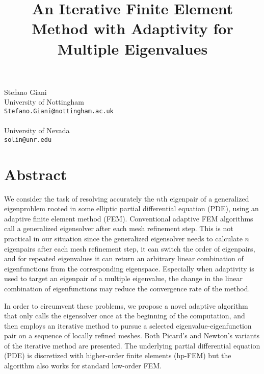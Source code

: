 \title{An Iterative Finite Element Method with Adaptivity for Multiple Eigenvalues}
 \author{} \institute{}
\maketitle
\begin{center}
{\large Stefano Giani}\\
University of Nottingham\\
{\tt Stefano.Giani@nottingham.ac.uk}
\\ \vspace{4mm}{\large Pavel Solin}\\
University of Nevada\\
{\tt solin@unr.edu}

\end{center}

\section*{Abstract}

We consider the task of resolving accurately the $n$th eigenpair of a generalized
eigenproblem rooted in some elliptic partial differential equation (PDE), using an adaptive finite
element method (FEM). 
Conventional adaptive FEM algorithms call a generalized eigensolver after
each mesh refinement step. This is not practical in our situation since the generalized eigensolver
needs to calculate $n$ eigenpairs after each mesh refinement step, it can switch the order of eigenpairs,
and for repeated eigenvalues it can return an arbitrary linear combination of eigenfunctions from
the corresponding eigenspace. Especially when adaptivity is used to target an eigenpair of a multiple
eigenvalue, the change in the linear combination of eigenfunctions may reduce the convergence rate of 
the method.

In order to circumvent these problems, we propose a novel adaptive
algorithm that only calls the eigensolver once at the beginning of the computation, and then employs
an iterative method to pursue a selected eigenvalue-eigenfunction pair on a sequence of locally refined
meshes. Both Picard's and Newton's variants of the iterative method are presented. The underlying
partial differential equation (PDE) is discretized with higher-order finite elements (hp-FEM) but
the algorithm also works for standard low-order FEM. 


